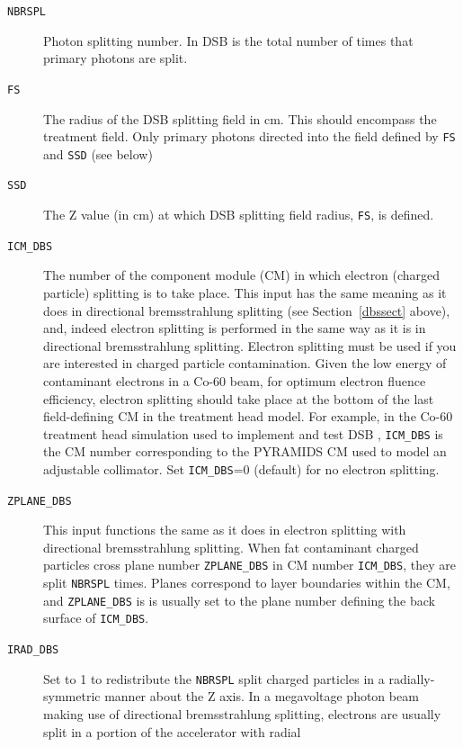 \documentclass[12pt,twoside]{article}
\begin{document}
\begin{description}
\item [{\tt NBRSPL}] Photon splitting number.  In DSB is the total number of times that primary
photons are split.
\item [{\tt FS}]  The radius of the DSB splitting field in cm.  This should encompass the
treatment field.  Only primary photons directed into the field defined by {\tt FS} and {\tt SSD} (see below)
\item [{\tt SSD}]  The Z value (in cm)
at which DSB splitting field radius, {\tt FS}, is defined.
\item [{\tt ICM\_DBS}] The number of the component module (CM) in which
electron (charged particle) splitting is to take place.  This input has the same
meaning as it does in directional bremsstrahlung splitting (see Section~\ref{dbssect} above), and, indeed
electron splitting is performed in the same way as it is in directional bremsstrahlung splitting.  Electron
splitting must be used if you are interested in charged particle contamination.  Given the low energy
of contaminant electrons in a Co-60 beam, for optimum electron
fluence efficiency, electron splitting should take place at the bottom of the last field-defining
CM in the treatment head model.  For example, in the Co-60 treatment head simulation used to implement
and test DSB \cite{KW14}, {\tt ICM\_DBS} is the CM number corresponding to the PYRAMIDS CM used to model an
adjustable collimator.
Set {\tt ICM\_DBS}=0 (default) for no electron splitting.
\item [{\tt ZPLANE\_DBS}] This input functions the same as it does in electron splitting with
directional bremsstrahlung splitting.
When fat contaminant charged particles cross plane number {\tt ZPLANE\_DBS} in CM number {\tt ICM\_DBS}, they are split
{\tt NBRSPL} times.
Planes correspond to layer boundaries within the CM, and {\tt ZPLANE\_DBS} is is usually set to the plane number
defining the back surface of {\tt ICM\_DBS}.
\item [{\tt IRAD\_DBS}] Set to 1 to redistribute the {\tt NBRSPL} split
charged particles in a radially-symmetric manner about the Z axis.  In a megavoltage photon beam making use of
directional bremsstrahlung splitting, electrons are usually split in a portion of the accelerator with radial

\end{description}
\end{document}
